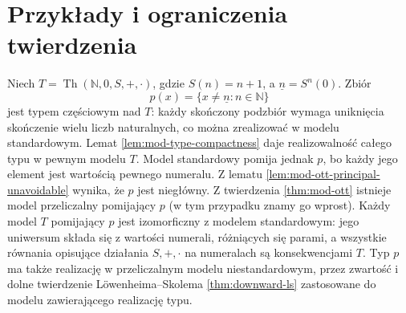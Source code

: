 \section{Przykłady i ograniczenia twierdzenia}
\begin{przyklad}
\label{ex:mod-ott-arithmetic}
Niech $T=\operatorname{Th}(\mathbb N,0,S,+,\cdot)$,
gdzie $S(n)=n+1$, a $\underline n=S^n(0)$.
Zbiór
\[
p(x)=\{x\ne\underline n:n\in\mathbb N\}
\]
jest typem częściowym nad $T$:
każdy skończony podzbiór wymaga uniknięcia
skończenie wielu liczb naturalnych, co można
zrealizować w modelu standardowym. Lemat
\ref{lem:mod-type-compactness} daje realizowalność
całego typu w pewnym modelu $T$.
Model standardowy pomija jednak $p$, bo każdy
jego element jest wartością pewnego numeralu.
Z lematu \ref{lem:mod-ott-principal-unavoidable}
wynika, że $p$ jest niegłówny. Z twierdzenia
\ref{thm:mod-ott} istnieje model przeliczalny
pomijający $p$ (w tym przypadku znamy go wprost).
Każdy model $T$ pomijający $p$ jest izomorficzny
z modelem standardowym: jego uniwersum składa
się z wartości numerali, różniących się parami,
a wszystkie równania opisujące działania $S,+,\cdot$
na numeralach są konsekwencjami $T$.
Typ $p$ ma także realizację w przeliczalnym
modelu niestandardowym, przez zwartość i dolne
twierdzenie Löwenheima--Skolema
\ref{thm:downward-ls} zastosowane do modelu
zawierającego realizację typu.
\end{przyklad}

